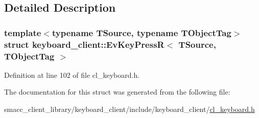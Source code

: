 \subsection{Detailed Description}
\subsubsection*{template$<$typename T\+Source, typename T\+Object\+Tag$>$\newline
struct keyboard\+\_\+client\+::\+Ev\+Key\+Press\+R$<$ T\+Source, T\+Object\+Tag $>$}



Definition at line 102 of file cl\+\_\+keyboard.\+h.



The documentation for this struct was generated from the following file\+:\begin{DoxyCompactItemize}
\item 
smacc\+\_\+client\+\_\+library/keyboard\+\_\+client/include/keyboard\+\_\+client/\hyperlink{cl__keyboard_8h}{cl\+\_\+keyboard.\+h}\end{DoxyCompactItemize}
